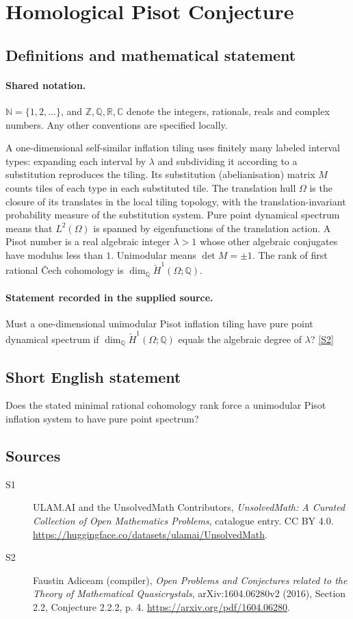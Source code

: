 \documentclass[11pt]{article}
\newcommand{\sref}[2]{\hyperlink{source:#1:#2}{[S#2]}}
\begin{document}
\section{Homological Pisot Conjecture}\label{statement}

\subsection{Definitions and mathematical statement}

\paragraph{Shared notation.}$\mathbb N=\{1,2,\ldots\}$, and $\mathbb Z,\mathbb Q,\mathbb R,\mathbb C$ denote the integers, rationals, reals and complex numbers. Any other conventions are specified locally.


A one-dimensional self-similar inflation tiling uses finitely many labeled interval types: expanding each interval by $\lambda$ and subdividing it according to a substitution reproduces the tiling. Its substitution (abelianisation) matrix $M$ counts tiles of each type in each substituted tile. The translation hull $\Omega$ is the closure of its translates in the local tiling topology, with the translation-invariant probability measure of the substitution system. Pure point dynamical spectrum means that $L^2(\Omega)$ is spanned by eigenfunctions of the translation action. A Pisot number is a real algebraic integer $\lambda>1$ whose other algebraic conjugates have modulus less than $1$. Unimodular means $\det M=\pm1$. The rank of first rational Čech cohomology is $\dim_{\mathbb Q}\check H^1(\Omega;\mathbb Q)$.
\paragraph{Statement recorded in the supplied source.}
Must a one-dimensional unimodular Pisot inflation tiling have pure point dynamical spectrum if $\dim_{\mathbb Q}\check H^1(\Omega;\mathbb Q)$ equals the algebraic degree of $\lambda$? \sref{statement}{2}
\subsection{Short English statement}
Does the stated minimal rational cohomology rank force a unimodular Pisot inflation system to have pure point spectrum?
\subsection{Sources}
\begin{description}
\item[\hypertarget{source:statement:1}{S1}] ULAM.AI and the UnsolvedMath Contributors, \emph{UnsolvedMath: A Curated Collection of Open Mathematics Problems}, catalogue entry. CC BY 4.0. \url{https://huggingface.co/datasets/ulamai/UnsolvedMath}.
\item[\hypertarget{source:statement:2}{S2}] Faustin Adiceam (compiler), \emph{Open Problems and Conjectures related to the Theory of Mathematical Quasicrystals}, arXiv:1604.06280v2 (2016), Section 2.2, Conjecture 2.2.2, p. 4. \url{https://arxiv.org/pdf/1604.06280}.
\end{description}
\label{end:statement}
\end{document}
